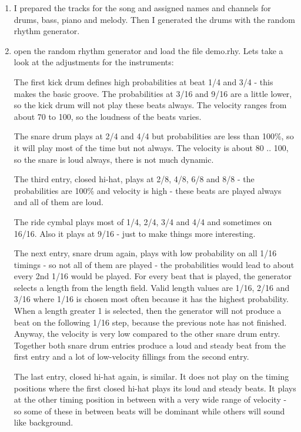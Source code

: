 \documentclass[letterpaper]{report}
\begin{document}
\begin{enumerate}

\item I prepared the tracks for the song and assigned names and channels for
drums, bass, piano and melody. Then I generated the drums with the
random rhythm generator.

\item open the random rhythm generator and load the file demo.rhy. Lets take a
look at the adjustments for the instruments:

The first kick drum defines high probabilities at beat 1/4 and 3/4 -
this makes the basic groove. The probabilities at 3/16 and 9/16 are a
little lower, so the kick drum will not play these beats always. The
velocity ranges from about 70 to 100, so the loudness of the beats varies.

The snare drum plays at 2/4 and 4/4 but probabilities are less than 100\%, so
it will play most of the time but not always. The velocity is about 80 .. 100, so
the snare is loud always, there is not much dynamic.

The third entry, closed hi-hat, plays at 2/8, 4/8, 6/8 and 8/8 - the probabilities
are 100\% and velocity is high - these beats are played always and all of them are
loud.

The ride cymbal plays most of 1/4, 2/4, 3/4 and 4/4 and sometimes on 16/16. Also
it plays at 9/16 - just to make things more interesting.

The next entry, snare drum again, plays with low probability on all 1/16 timings -
so not all of them are played - the probabilities would lead to about every 2nd
1/16 would be played. For every beat that is played, the generator selects a
length from the length field. Valid length values are 1/16, 2/16 and 3/16 where
1/16 is chosen most often because it has the highest probability. When a length
greater 1 is selected, then the generator will not produce a beat on the following
1/16 step, because the previous note has not finished. Anyway, the velocity is
very low compared to the other snare drum entry. Together both snare drum entries
produce a loud and steady beat from the first entry and a lot of low-velocity
fillings from the second entry.

The last entry, closed hi-hat again, is similar. It does not play on the timing positions
where the first closed hi-hat plays its loud and steady beats. It plays at the other
timing position in between with a very wide range of velocity - so some of these
in between beats will be dominant while others will sound like background.



\end{enumerate}
\end{document}
